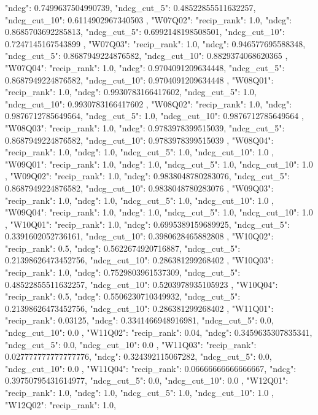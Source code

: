 {{  "ndcg": 0.7499637504990739,
  "ndcg_cut_5": 0.48522855511632257,
  "ndcg_cut_10": 0.6114902967340503
 },
 "W07Q02": {
  "recip_rank": 1.0,
  "ndcg": 0.8685703692285813,
  "ndcg_cut_5": 0.6992148198508501,
  "ndcg_cut_10": 0.7247145167543899
 },
 "W07Q03": {
  "recip_rank": 1.0,
  "ndcg": 0.946577695588348,
  "ndcg_cut_5": 0.8687949224876582,
  "ndcg_cut_10": 0.8829374068620365
 },
 "W07Q04": {
  "recip_rank": 1.0,
  "ndcg": 0.9704091209634448,
  "ndcg_cut_5": 0.8687949224876582,
  "ndcg_cut_10": 0.9704091209634448
 },
 "W08Q01": {
  "recip_rank": 1.0,
  "ndcg": 0.9930783166417602,
  "ndcg_cut_5": 1.0,
  "ndcg_cut_10": 0.9930783166417602
 },
 "W08Q02": {
  "recip_rank": 1.0,
  "ndcg": 0.9876712785649564,
  "ndcg_cut_5": 1.0,
  "ndcg_cut_10": 0.9876712785649564
 },
 "W08Q03": {
  "recip_rank": 1.0,
  "ndcg": 0.9783978399515039,
  "ndcg_cut_5": 0.8687949224876582,
  "ndcg_cut_10": 0.9783978399515039
 },
 "W08Q04": {
  "recip_rank": 1.0,
  "ndcg": 1.0,
  "ndcg_cut_5": 1.0,
  "ndcg_cut_10": 1.0
 },
 "W09Q01": {
  "recip_rank": 1.0,
  "ndcg": 1.0,
  "ndcg_cut_5": 1.0,
  "ndcg_cut_10": 1.0
 },
 "W09Q02": {
  "recip_rank": 1.0,
  "ndcg": 0.9838048780283076,
  "ndcg_cut_5": 0.8687949224876582,
  "ndcg_cut_10": 0.9838048780283076
 },
 "W09Q03": {
  "recip_rank": 1.0,
  "ndcg": 1.0,
  "ndcg_cut_5": 1.0,
  "ndcg_cut_10": 1.0
 },
 "W09Q04": {
  "recip_rank": 1.0,
  "ndcg": 1.0,
  "ndcg_cut_5": 1.0,
  "ndcg_cut_10": 1.0
 },
 "W10Q01": {
  "recip_rank": 1.0,
  "ndcg": 0.6995389159689925,
  "ndcg_cut_5": 0.3391602052736161,
  "ndcg_cut_10": 0.3980628465882808
 },
 "W10Q02": {
  "recip_rank": 0.5,
  "ndcg": 0.5622674920716887,
  "ndcg_cut_5": 0.21398626473452756,
  "ndcg_cut_10": 0.286381299268402
 },
 "W10Q03": {
  "recip_rank": 1.0,
  "ndcg": 0.7529803961537309,
  "ndcg_cut_5": 0.48522855511632257,
  "ndcg_cut_10": 0.5203978935105923
 },
 "W10Q04": {
  "recip_rank": 0.5,
  "ndcg": 0.5506230710349932,
  "ndcg_cut_5": 0.21398626473452756,
  "ndcg_cut_10": 0.286381299268402
 },
 "W11Q01": {
  "recip_rank": 0.03125,
  "ndcg": 0.3341466948916981,
  "ndcg_cut_5": 0.0,
  "ndcg_cut_10": 0.0
 },
 "W11Q02": {
  "recip_rank": 0.04,
  "ndcg": 0.3459635307835341,
  "ndcg_cut_5": 0.0,
  "ndcg_cut_10": 0.0
 },
 "W11Q03": {
  "recip_rank": 0.027777777777777776,
  "ndcg": 0.324392115067282,
  "ndcg_cut_5": 0.0,
  "ndcg_cut_10": 0.0
 },
 "W11Q04": {
  "recip_rank": 0.06666666666666667,
  "ndcg": 0.39750795431614977,
  "ndcg_cut_5": 0.0,
  "ndcg_cut_10": 0.0
 },
 "W12Q01": {
  "recip_rank": 1.0,
  "ndcg": 1.0,
  "ndcg_cut_5": 1.0,
  "ndcg_cut_10": 1.0
 },
 "W12Q02": {
  "recip_rank": 1.0,
}}
